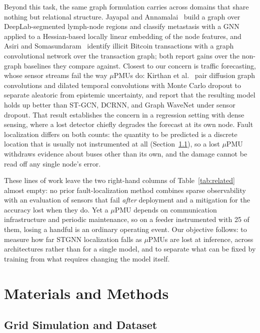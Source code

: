\documentclass[3p,times,procedia]{elsarticle}
\begin{document}
Beyond this task, the same graph formulation carries across domains that share nothing but relational structure. Jayapal and Annamalai~\cite{jayapal2025} build a graph over DeepLab-segmented lymph-node regions and classify metastasis with a GNN applied to a Hessian-based locally linear embedding of the node features, and Asiri and Somasundaram~\cite{asiri2025} identify illicit Bitcoin transactions with a graph convolutional network over the transaction graph; both report gains over the non-graph baselines they compare against. Closest to our concern is traffic forecasting, whose sensor streams fail the way $\mu$PMUs do: Kirthan et al.~\cite{kirthan2026} pair diffusion graph convolutions and dilated temporal convolutions with Monte Carlo dropout to separate aleatoric from epistemic uncertainty, and report that the resulting model holds up better than ST-GCN, DCRNN, and Graph WaveNet under sensor dropout. That result establishes the concern in a regression setting with dense sensing, where a lost detector chiefly degrades the forecast at its own node. Fault localization differs on both counts: the quantity to be predicted is a discrete location that is usually not instrumented at all (Section~\ref{sec:dataset}), so a lost $\mu$PMU withdraws evidence about buses other than its own, and the damage cannot be read off any single node's error.

These lines of work leave the two right-hand columns of Table~\ref{tab:related} almost empty: no prior fault-localization method combines sparse observability with an evaluation of sensors that fail \emph{after} deployment and a mitigation for the accuracy lost when they do. Yet a $\mu$PMU depends on communication infrastructure and periodic maintenance, so on a feeder instrumented with 25 of them, losing a handful is an ordinary operating event. Our objective follows: to measure how far STGNN localization falls as $\mu$PMUs are lost at inference, across architectures rather than for a single model, and to separate what can be fixed by training from what requires changing the model itself.

\section{Materials and Methods}
\label{sec:methods}

\subsection{Grid Simulation and Dataset}
\label{sec:dataset}
\end{document}
